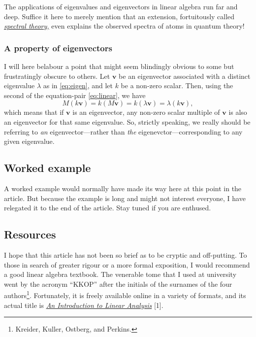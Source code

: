 \documentclass[
  11pt,
  a4paper,
]{article}
\begin{document}
The applications of eigenvalues and eigenvectors in linear algebra run
far and deep. Suffice it here to merely mention that an extension,
fortuitously called
\href{https://en.wikipedia.org/wiki/Spectral_theory}{\emph{spectral
theory,}} even explains the observed spectra of atoms in quantum theory!

\hypertarget{a-property-of-eigenvectors}{%
\subsubsection{A property of
eigenvectors}\label{a-property-of-eigenvectors}}

I will here belabour a point that might seem blindingly obvious to some
but frustratingly obscure to others. Let \(\symbf{v}\) be an eigenvector
associated with a distinct eigenvalue \(\lambda\) as in \cref{eq:eigen},
and let \(k\) be a non-zero scalar. Then, using the second of the
equation-pair \cref{eq:linear}, we have \begin{equation}
M(k\symbf{v}) = k(M\symbf{v}) = k(\lambda\symbf{v}) = \lambda(k\symbf{v}),
\label{eq:scaled-eigenvector}\end{equation} which means that if
\(\symbf{v}\) is an eigenvector, any non-zero scalar multiple of
\(\symbf{v}\) is also an eigenvector for that same eigenvalue. So,
strictly speaking, we really should be referring to \emph{an}
eigenvector---rather than \emph{the} eigenevctor---corresponding to any
given eigenvalue.

\hypertarget{worked-example}{%
\subsection{Worked example}\label{worked-example}}

A worked example would normally have made its way here at this point in
the article. But because the example is long and might not interest
everyone, I have relegated it to the end of the article. Stay tuned if
you are enthused.

\hypertarget{resources}{%
\subsection{Resources}\label{resources}}

I hope that this article has not been so brief as to be cryptic and
off-putting. To those in search of greater rigour or a more formal
exposition, I would recommend a good linear algebra textbook. The
venerable tome that I used at university went by the acronym ``KKOP''
after the initials of the surnames of the four authors\footnote{Kreider,
  Kuller, Ostberg, and Perkins.}. Fortunately, it is freely available
online in a variety of formats, and its actual title is
\href{https://archive.org/details/AnIntroductionToLinearAnalysis}{\emph{An
Introduction to Linear Analysis}} {[}1{]}.
\end{document}
